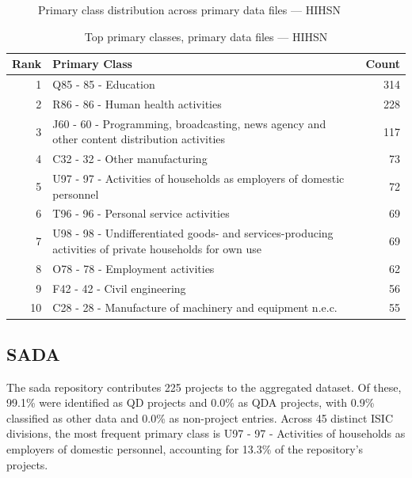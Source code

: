 \clearpage

\begin{figure}[H]
    \centering
    
    \caption{Primary class distribution across primary data files --- HIHSN}
\end{figure}

\begin{table}[H]
    \centering
    \begin{tabular}{r p{10cm} r}
    \hline
    \textbf{Rank} & \textbf{Primary Class} & \textbf{Count} \\
    \hline
    1 & Q85 - 85 - Education & 314 \\
    2 & R86 - 86 - Human health activities & 228 \\
    3 & J60 - 60 - Programming, broadcasting, news agency and other content distribution activities & 117 \\
    4 & C32 - 32 - Other manufacturing & 73 \\
    5 & U97 - 97 - Activities of households as employers of domestic personnel & 72 \\
    6 & T96 - 96 - Personal service activities & 69 \\
    7 & U98 - 98 - Undifferentiated goods- and services-producing activities of private households for own use & 69 \\
    8 & O78 - 78 - Employment activities & 62 \\
    9 & F42 - 42 - Civil engineering & 56 \\
    10 & C28 - 28 - Manufacture of machinery and equipment n.e.c. & 55 \\
    \hline
    \end{tabular}
    \caption{Top primary classes, primary data files --- HIHSN}
\end{table}

\clearpage

\subsection{SADA}


The sada repository contributes 225 projects to the aggregated dataset. Of these, 99.1\% were identified as QD projects and 0.0\% as QDA projects, with 0.9\% classified as other data and 0.0\% as non-project entries. Across 45 distinct ISIC divisions, the most frequent primary class is U97 - 97 - Activities of households as employers of domestic personnel, accounting for 13.3\% of the repository's projects.


